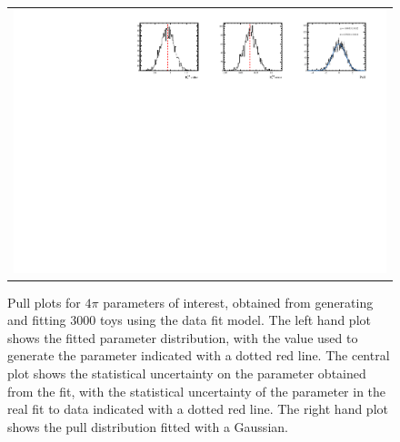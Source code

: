 \begin{figure}
\begin{tabular}{c}
\includegraphics[width=\textwidth]{ANA_resources/Plots/Data_fit/FitterBias//split//R_Bs_pipipipi_run2.pdf} \\
  \end{tabular}
  \caption{Pull plots for $4\pi$ parameters of interest, obtained from generating and fitting 3000 toys using the data fit model. The left hand plot shows the fitted parameter distribution, with the value used to generate the parameter indicated with a dotted red line. The central plot shows the statistical uncertainty on the parameter obtained from the fit, with the statistical uncertainty of the parameter in the real fit to data indicated with a dotted red line. The right hand plot shows the pull distribution fitted with a Gaussian.}
\label{fig:4pi/split/_pulls}
\end{figure}
